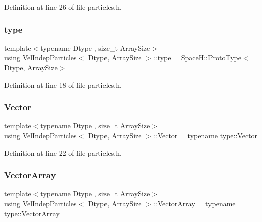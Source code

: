 Definition at line 26 of file particles.\+h.

\mbox{\label{class_vel_indep_particles_a0c62b43c2f0a50565e5e06587fddee18}} 
\subsubsection{\texorpdfstring{type}{type}}
{\footnotesize\ttfamily template$<$typename Dtype , size\+\_\+t Array\+Size$>$ \\
using \mbox{\hyperlink{class_vel_indep_particles}{Vel\+Indep\+Particles}}$<$ Dtype, Array\+Size $>$\+::\mbox{\hyperlink{class_vel_indep_particles_a0c62b43c2f0a50565e5e06587fddee18}{type}} =  \mbox{\hyperlink{struct_space_h_1_1_proto_type}{Space\+H\+::\+Proto\+Type}}$<$Dtype, Array\+Size$>$}



Definition at line 18 of file particles.\+h.

\mbox{\label{class_vel_indep_particles_aa7e03da81f44941c06abf43ec2180079}} 
\subsubsection{\texorpdfstring{Vector}{Vector}}
{\footnotesize\ttfamily template$<$typename Dtype , size\+\_\+t Array\+Size$>$ \\
using \mbox{\hyperlink{class_vel_indep_particles}{Vel\+Indep\+Particles}}$<$ Dtype, Array\+Size $>$\+::\mbox{\hyperlink{class_vel_indep_particles_aa7e03da81f44941c06abf43ec2180079}{Vector}} =  typename \mbox{\hyperlink{struct_space_h_1_1_proto_type_a316b81f4660b2b4fab14a8e1f23b6089}{type\+::\+Vector}}}



Definition at line 22 of file particles.\+h.

\mbox{\label{class_vel_indep_particles_a27580f65b6523bfb6900520af2e44708}} 
\subsubsection{\texorpdfstring{Vector\+Array}{VectorArray}}
{\footnotesize\ttfamily template$<$typename Dtype , size\+\_\+t Array\+Size$>$ \\
using \mbox{\hyperlink{class_vel_indep_particles}{Vel\+Indep\+Particles}}$<$ Dtype, Array\+Size $>$\+::\mbox{\hyperlink{class_vel_indep_particles_a27580f65b6523bfb6900520af2e44708}{Vector\+Array}} =  typename \mbox{\hyperlink{struct_space_h_1_1_proto_type_a622b8e122b33bb4966a02299fb7b82d6}{type\+::\+Vector\+Array}}}




